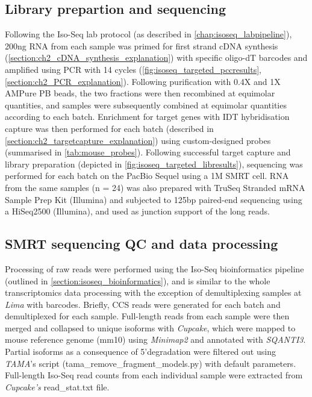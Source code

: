 \subsection{Library prepartion and sequencing}
Following the Iso-Seq lab protocol (as described in \cref{chap:isoseq_labpipeline}), 200ng RNA from each sample was primed for first strand cDNA synthesis (\cref{section:ch2_cDNA_synthesis_explanation}) with specific oligo-dT barcodes and amplified using PCR with 14 cycles (\cref{fig:isoseq_targeted_pccresults}, \cref{section:ch2_PCR_explanation}). Following purification with 0.4X and 1X AMPure PB beads, the two fractions were then recombined at equimolar quantities, and samples were subsequently combined at equimolar quantities according to each batch. Enrichment for target genes with IDT hybridisation capture was then performed for each batch (described in \cref{section:ch2_targetcapture_explanation}) using custom-designed probes (summarised in \cref{tab:mouse_probes}). Following successful target capture and library preparation (depicted in \cref{fig:isoseq_targeted_libresults}), sequencing was performed for each batch on the PacBio Sequel using a 1M SMRT cell. RNA from the same samples (n = 24) was also prepared with TruSeq Stranded mRNA Sample Prep Kit (Illumina) and subjected to 125bp paired-end sequencing using a HiSeq2500 (Illumina), and used as junction support of the long reads. 

\subsection{SMRT sequencing QC and data processing}
Processing of raw reads were performed using the Iso-Seq bioinformatics pipeline (outlined in \cref{section:isoseq_bioinformatics}), and is similar to the whole transcriptomics data processing with the exception of demultiplexing samples at \textit{Lima} with barcodes. Briefly, CCS reads were generated for each batch and demultiplexed for each sample. Full-length reads from each sample were then merged and collapsed to unique isoforms with \textit{Cupcake}, which were mapped to mouse reference genome (mm10) using \textit{Minimap2} and annotated with \textit{SQANTI3}. Partial isoforms as a consequence of 5'degradation were filtered out using \textit{TAMA}'s script (tama\_remove\_fragment\_models.py) with default parameters. Full-length Iso-Seq read counts from each individual sample were extracted from \textit{Cupcake's} read\_stat.txt file.

